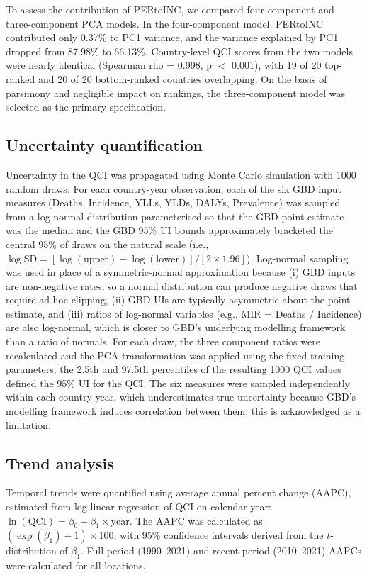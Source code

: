 \documentclass[12pt]{article}
\begin{document}
To assess the contribution of PERtoINC, we compared four-component and three-component PCA models. In the four-component model, PERtoINC contributed only 0.37\% to PC1 variance, and the variance explained by PC1 dropped from 87.98\% to 66.13\%. Country-level QCI scores from the two models were nearly identical (Spearman rho = 0.998, p $<$ 0.001), with 19 of 20 top-ranked and 20 of 20 bottom-ranked countries overlapping. On the basis of parsimony and negligible impact on rankings, the three-component model was selected as the primary specification.

\subsection{Uncertainty quantification}

Uncertainty in the QCI was propagated using Monte Carlo simulation with 1000 random draws. For each country-year observation, each of the six GBD input measures (Deaths, Incidence, YLLs, YLDs, DALYs, Prevalence) was sampled from a log-normal distribution parameterised so that the GBD point estimate was the median and the GBD 95\% UI bounds approximately bracketed the central 95\% of draws on the natural scale (i.e., $\log\mathrm{SD} = [\log(\text{upper}) - \log(\text{lower})] / [2 \times 1.96]$). Log-normal sampling was used in place of a symmetric-normal approximation because (i) GBD inputs are non-negative rates, so a normal distribution can produce negative draws that require ad hoc clipping, (ii) GBD UIs are typically asymmetric about the point estimate, and (iii) ratios of log-normal variables (e.g., MIR = Deaths / Incidence) are also log-normal, which is closer to GBD's underlying modelling framework than a ratio of normals. For each draw, the three component ratios were recalculated and the PCA transformation was applied using the fixed training parameters; the 2.5th and 97.5th percentiles of the resulting 1000 QCI values defined the 95\% UI for the QCI. The six measures were sampled independently within each country-year, which underestimates true uncertainty because GBD's modelling framework induces correlation between them; this is acknowledged as a limitation.

\subsection{Trend analysis}

Temporal trends were quantified using average annual percent change (AAPC), estimated from log-linear regression of QCI on calendar year: $\ln(\text{QCI}) = \beta_0 + \beta_1 \times \text{year}$. The AAPC was calculated as $(\exp(\beta_1) - 1) \times 100$, with 95\% confidence intervals derived from the $t$-distribution of $\beta_1$. Full-period (1990--2021) and recent-period (2010--2021) AAPCs were calculated for all locations.
\end{document}
